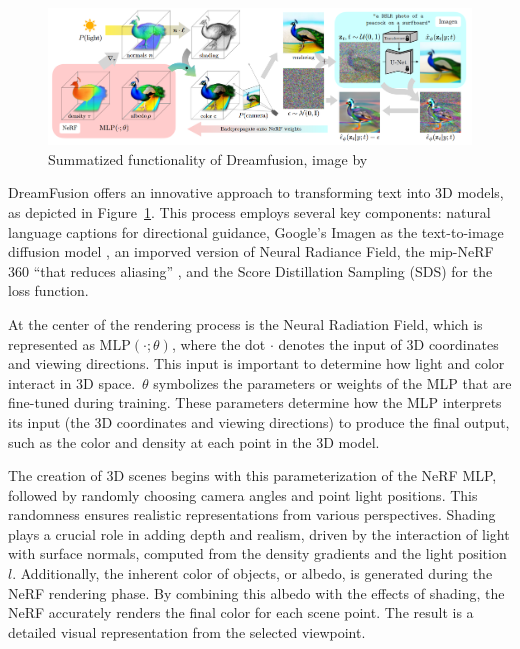 \begin{figure}[ht]
  \centering
    \includegraphics[width=1\columnwidth]{figures/Dreamfusion.png}
    \caption{Summatized functionality of Dreamfusion, image by \citep{pooleDreamfusion}}\label{fig:figureDreamfusion}
  \end{figure}

DreamFusion offers an innovative approach to transforming text into 3D models, as depicted in Figure~\ref{fig:figureDreamfusion}. This process employs several key components: natural language captions for directional guidance, Google's Imagen as the text-to-image diffusion model \citep{saharia2022imagen}, an imporved version of Neural Radiance Field, the mip-NeRF 360 \citep{barron2022mipnerf} ``that reduces aliasing'' \citep{pooleDreamfusion}, and the Score Distillation Sampling (SDS) for the loss function.

At the center of the rendering process is the Neural Radiation Field, which is represented as \( \text{MLP}(\cdot; \theta) \), where the dot \(\cdot\) denotes the input of 3D coordinates and viewing directions. This input is important to determine how light and color interact in 3D space.~\(\theta\) symbolizes the parameters or weights of the MLP that are fine-tuned during training. These parameters determine how the MLP interprets its input (the 3D coordinates and viewing directions) to produce the final output, such as the color and density at each point in the 3D model.

The creation of 3D scenes begins with this parameterization of the NeRF MLP, followed by randomly choosing camera angles and point light positions. This randomness ensures realistic representations from various perspectives. Shading plays a crucial role in adding depth and realism, driven by the interaction of light with surface normals, computed from the density gradients and the light position \( l \). Additionally, the inherent color of objects, or albedo, is generated during the NeRF rendering phase. By combining this albedo with the effects of shading, the NeRF accurately renders the final color for each scene point. The result is a detailed visual representation from the selected viewpoint.


